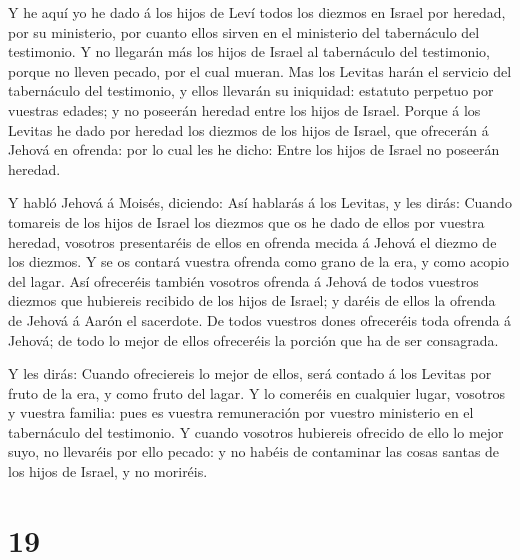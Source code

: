  Y he aquí yo he dado á los hijos de Leví todos los diezmos
en Israel por heredad, por su ministerio, por cuanto ellos sirven en el
ministerio del tabernáculo del testimonio.  Y no llegarán
más los hijos de Israel al tabernáculo del testimonio, porque no lleven
pecado, por el cual mueran.  Mas los Levitas harán el
servicio del tabernáculo del testimonio, y ellos llevarán su iniquidad:
estatuto perpetuo por vuestras edades; y no poseerán heredad entre los
hijos de Israel.  Porque á los Levitas he dado por heredad
los diezmos de los hijos de Israel, que ofrecerán á Jehová en ofrenda:
por lo cual les he dicho: Entre los hijos de Israel no poseerán heredad.

 Y habló Jehová á Moisés, diciendo:  Así
hablarás á los Levitas, y les dirás: Cuando tomareis de los hijos de
Israel los diezmos que os he dado de ellos por vuestra heredad, vosotros
presentaréis de ellos en ofrenda mecida á Jehová el diezmo de los
diezmos.  Y se os contará vuestra ofrenda como grano de la
era, y como acopio del lagar.  Así ofreceréis también
vosotros ofrenda á Jehová de todos vuestros diezmos que hubiereis
recibido de los hijos de Israel; y daréis de ellos la ofrenda de Jehová
á Aarón el sacerdote.  De todos vuestros dones ofreceréis
toda ofrenda á Jehová; de todo lo mejor de ellos ofreceréis la porción
que ha de ser consagrada.

 Y les dirás: Cuando ofreciereis lo mejor de ellos, será
contado á los Levitas por fruto de la era, y como fruto del lagar.
 Y lo comeréis en cualquier lugar, vosotros y vuestra
familia: pues es vuestra remuneración por vuestro ministerio en el
tabernáculo del testimonio.  Y cuando vosotros hubiereis
ofrecido de ello lo mejor suyo, no llevaréis por ello pecado: y no
habéis de contaminar las cosas santas de los hijos de Israel, y no
moriréis.

\hypertarget{section-18}{%
\section{19}\label{section-18}}

